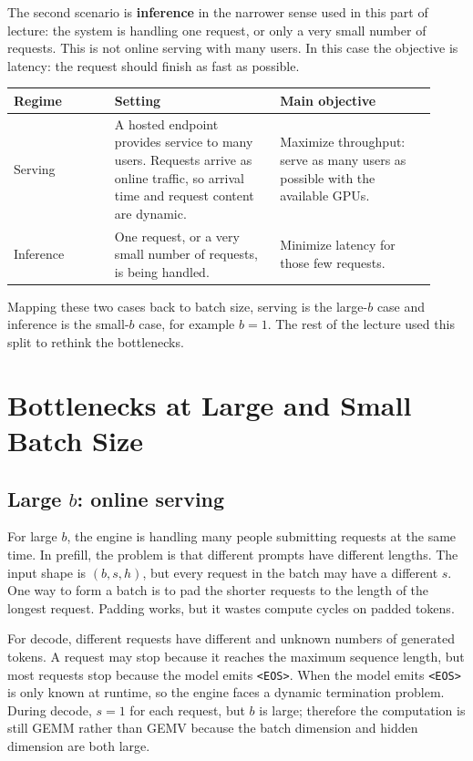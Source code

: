 \documentclass[twoside]{article}
\newcommand{\EOS}{\texttt{<EOS>}}
\begin{document}
The second scenario is \textbf{inference} in the narrower sense used in this part of lecture: the system is handling one request, or only a very small number of requests.  This is not online serving with many users.  In this case the objective is latency: the request should finish as fast as possible.

\begin{center}
\begin{tabular}{@{}p{0.22\linewidth}p{0.36\linewidth}p{0.34\linewidth}@{}}
\toprule
Regime & Setting & Main objective \\
\midrule
Serving & A hosted endpoint provides service to many users.  Requests arrive as online traffic, so arrival time and request content are dynamic. & Maximize throughput: serve as many users as possible with the available GPUs. \\
Inference & One request, or a very small number of requests, is being handled. & Minimize latency for those few requests. \\
\bottomrule
\end{tabular}
\end{center}

Mapping these two cases back to batch size, serving is the large-\(b\) case and inference is the small-\(b\) case, for example \(b=1\).  The rest of the lecture used this split to rethink the bottlenecks.

\section{Bottlenecks at Large and Small Batch Size}

\subsection{Large \(b\): online serving}

For large \(b\), the engine is handling many people submitting requests at the same time.  In prefill, the problem is that different prompts have different lengths.  The input shape is \((b,s,h)\), but every request in the batch may have a different \(s\).  One way to form a batch is to pad the shorter requests to the length of the longest request.  Padding works, but it wastes compute cycles on padded tokens.

For decode, different requests have different and unknown numbers of generated tokens.  A request may stop because it reaches the maximum sequence length, but most requests stop because the model emits \EOS.  When the model emits \EOS{} is only known at runtime, so the engine faces a dynamic termination problem.  During decode, \(s=1\) for each request, but \(b\) is large; therefore the computation is still GEMM rather than GEMV because the batch dimension and hidden dimension are both large.
\end{document}
